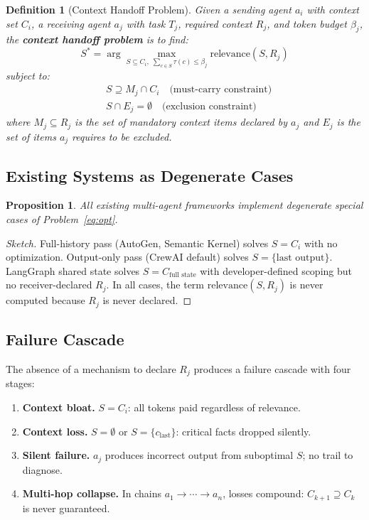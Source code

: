 \documentclass[11pt]{article}
\newtheorem{definition}{Definition}
\newtheorem{proposition}{Proposition}
\begin{document}
\begin{definition}[Context Handoff Problem]
Given a sending agent $a_i$ with context set $C_i$, a receiving agent $a_j$
with task $T_j$, required context $R_j$, and token budget $\beta_j$, the
\textbf{context handoff problem} is to find:
\begin{equation}
  S^* = \arg\max_{S \subseteq C_i,\; \sum_{c \in S} \tau(c) \leq \beta_j}
  \mathrm{relevance}(S, R_j)
  \label{eq:opt}
\end{equation}
subject to:
\begin{align}
  &S \supseteq M_j \cap C_i \quad \text{(must-carry constraint)} \label{eq:must}\\
  &S \cap E_j = \emptyset \quad \text{(exclusion constraint)} \label{eq:excl}
\end{align}
where $M_j \subseteq R_j$ is the set of mandatory context items declared by
$a_j$ and $E_j$ is the set of items $a_j$ requires to be excluded.
\end{definition}

\subsection{Existing Systems as Degenerate Cases}

\begin{proposition}
  All existing multi-agent frameworks implement degenerate special cases of
  Problem~\ref{eq:opt}.
\end{proposition}

\begin{proof}[Sketch]
Full-history pass (AutoGen, Semantic Kernel) solves $S = C_i$ with no
optimization. Output-only pass (CrewAI default) solves $S = \{\text{last
output}\}$. LangGraph shared state solves $S = C_{\text{full state}}$ with
developer-defined scoping but no receiver-declared $R_j$. In all cases, the
term $\mathrm{relevance}(S, R_j)$ is never computed because $R_j$ is never
declared.
\end{proof}

\subsection{Failure Cascade}

The absence of a mechanism to declare $R_j$ produces a failure cascade with
four stages:

\begin{enumerate}[label=\textbf{F\arabic*.}]
  \item \textbf{Context bloat.} $S = C_i$: all tokens paid regardless of
    relevance.
  \item \textbf{Context loss.} $S = \emptyset$ or $S = \{c_{\text{last}}\}$:
    critical facts dropped silently.
  \item \textbf{Silent failure.} $a_j$ produces incorrect output from
    suboptimal $S$; no trail to diagnose.
  \item \textbf{Multi-hop collapse.} In chains $a_1 \to \cdots \to a_n$,
    losses compound: $C_{k+1} \supseteq C_k$ is never guaranteed.
\end{enumerate}
\end{document}
